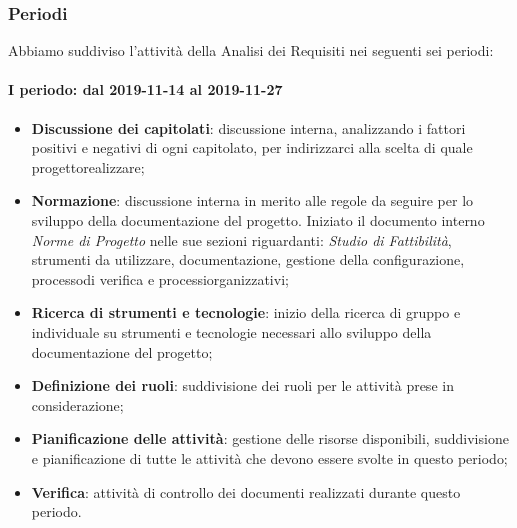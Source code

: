 \subsubsection{Periodi}
Abbiamo suddiviso l'attività della Analisi dei Requisiti nei seguenti sei periodi:
\paragraph*{I periodo: dal 2019-11-14 al 2019-11-27}
\begin{itemize}
	\item \textbf{Discussione dei capitolati}\glo: discussione interna, analizzando i fattori positivi e negativi di ogni capitolato\glo, per indirizzarci alla scelta di quale progetto\glosp realizzare;
	\item \textbf{Normazione}: discussione interna in merito alle regole da seguire per lo sviluppo della documentazione del progetto\glo. Iniziato il documento interno \textit{Norme di Progetto} nelle sue sezioni riguardanti: \textit{Studio di Fattibilità}, strumenti da utilizzare, documentazione, gestione della configurazione, processo\glosp di verifica e processi\glosp organizzativi;
	\item \textbf{Ricerca di strumenti e tecnologie}: inizio della ricerca di gruppo e individuale su strumenti e tecnologie necessari allo sviluppo della documentazione del progetto\glo;
	\item \textbf{Definizione dei ruoli}: suddivisione dei ruoli per le attività prese in considerazione; 
	\item \textbf{Pianificazione delle attività}: gestione delle risorse disponibili, suddivisione e pianificazione di tutte le attività che devono essere svolte in questo periodo;
	\item \textbf{Verifica}: attività di controllo dei documenti realizzati durante questo periodo.
\end{itemize}

